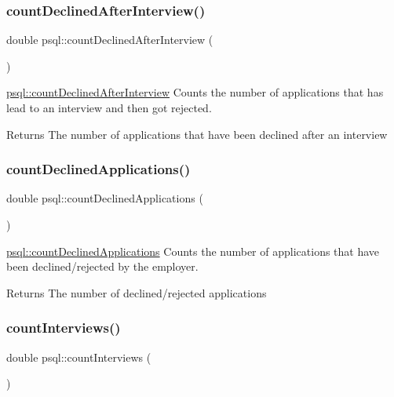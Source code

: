 \subsubsection{\texorpdfstring{countDeclinedAfterInterview()}{countDeclinedAfterInterview()}}
{\footnotesize\ttfamily double psql\+::count\+Declined\+After\+Interview (\begin{DoxyParamCaption}{ }\end{DoxyParamCaption})}



\mbox{\hyperlink{classpsql_a2ae512bc231446d5fccae84582395675}{psql\+::count\+Declined\+After\+Interview}} Counts the number of applications that has lead to an interview and then got rejected. 

\begin{DoxyReturn}{Returns}
The number of applications that have been declined after an interview 
\end{DoxyReturn}
\mbox{\label{classpsql_a40541367c3af9c0ac94e2fb92f00f53c}} 
\subsubsection{\texorpdfstring{countDeclinedApplications()}{countDeclinedApplications()}}
{\footnotesize\ttfamily double psql\+::count\+Declined\+Applications (\begin{DoxyParamCaption}{ }\end{DoxyParamCaption})}



\mbox{\hyperlink{classpsql_a40541367c3af9c0ac94e2fb92f00f53c}{psql\+::count\+Declined\+Applications}} Counts the number of applications that have been declined/rejected by the employer. 

\begin{DoxyReturn}{Returns}
The number of declined/rejected applications 
\end{DoxyReturn}
\mbox{\label{classpsql_a84c1fdea2d09783a39677c4f79d924fc}} 
\subsubsection{\texorpdfstring{countInterviews()}{countInterviews()}}
{\footnotesize\ttfamily double psql\+::count\+Interviews (\begin{DoxyParamCaption}{ }\end{DoxyParamCaption})}



